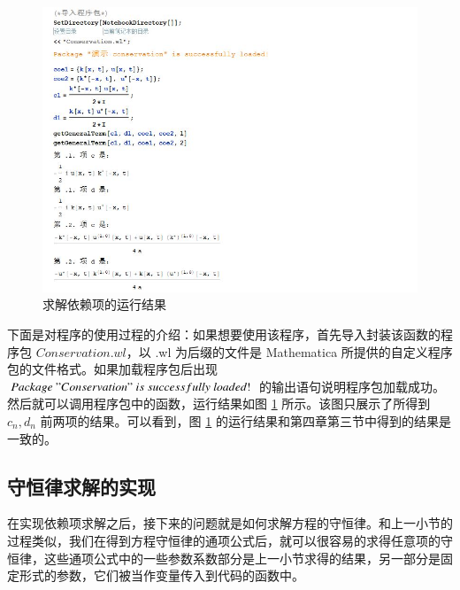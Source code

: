 \begin{figure}[!htp]
	\centering
	\includegraphics[width=0.97\linewidth]{getGeneralTerm.jpg}
	\caption{求解依赖项的运行结果}
	\label{picture-5-1}
\end{figure}
下面是对程序的使用过程的介绍：如果想要使用该程序，首先导入封装该函数的程序包 $Conservation.wl$，以 .wl 为后缀的文件是 Mathematica 所提供的自定义程序包的文件格式。如果加载程序包后出现 $Package \ "Conservation" \ is \ successfully \  loaded!$ 的输出语句说明程序包加载成功。然后就可以调用程序包中的函数，运行结果如图 \ref{picture-5-1} 所示。该图只展示了所得到$c_n, d_n$ 前两项的结果。可以看到，图 \ref{picture-5-1} 的运行结果和第四章第三节中得到的结果是一致的。


\subsection{守恒律求解的实现}
在实现依赖项求解之后，接下来的问题就是如何求解方程的守恒律。和上一小节的过程类似，我们在得到方程守恒律的通项公式后，就可以很容易的求得任意项的守恒律，这些通项公式中的一些参数系数部分是上一小节求得的结果，另一部分是固定形式的参数，它们被当作变量传入到代码的函数中。


